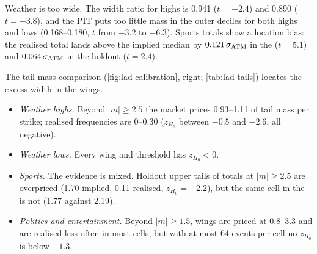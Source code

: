 Weather is too wide. The width ratio for highs is 0.941 ($t=-2.4$) and 0.890 ($t=-3.8$), and the
PIT puts too little mass in the outer deciles for both highs and lows (0.168--0.180, $t$ from
$-3.2$ to $-6.3$). Sports totals show a location bias: the realised total lands above the implied
median by $0.121\,\sigma_{\mathrm{ATM}}$ in the \estim{} ($t=5.1$) and $0.064\,\sigma_{\mathrm{ATM}}$ in the holdout ($t=2.4$).

The tail-mass comparison (\cref{fig:lad-calibration}, right; \cref{tab:lad-tails}) locates the
excess width in the wings.
\begin{itemize}
\item \emph{Weather highs.} Beyond $|m|\ge2.5$ the market prices 0.93--1.11\cents{} of tail mass
  per strike; realised frequencies are 0--0.30\cents{} ($z_{H_0}$ between $-0.5$ and $-2.6$, all
  negative).
\item \emph{Weather lows.} Every wing and threshold has $z_{H_0}<0$.
\item \emph{Sports.} The evidence is mixed. Holdout upper tails of totals at $|m|\ge2.5$ are
  overpriced (1.70\cents{} implied, 0.11\cents{} realised, $z_{H_0}=-2.2$), but the same cell in the
  \estim{} is not (1.77 against 2.19\cents).
\item \emph{Politics and entertainment.} Beyond $|m|\ge1.5$, wings are priced at 0.8--3.3\cents{} and
  are realised less often in most cells, but with at most 64 events per cell no $z_{H_0}$ is below
  $-1.3$.
\end{itemize}

